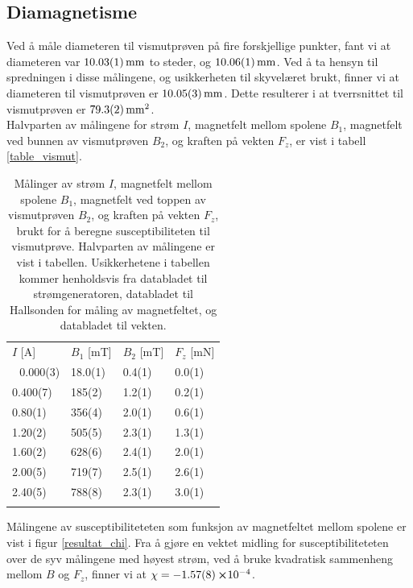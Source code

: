 \documentclass[%
 reprint,
 amsmath,amssymb,
 aps,
 norsk,
]{revtex4-1}
\begin{document}
\subsection{Diamagnetisme}
Ved å måle diameteren til vismutprøven på fire forskjellige punkter, fant vi at diameteren var $\SI{10.03\pm0.01}{\milli\meter}$ to steder, og $\SI{10.06\pm0.01}{\milli\meter}$. Ved å ta hensyn til spredningen i disse målingene, og usikkerheten til skyvelæret brukt, finner vi at diameteren til vismutprøven er $\SI{10.05\pm0.03}{\milli\meter}$. Dette resulterer i at tverrsnittet til vismutprøven er $\SI{79.3\pm0.2}{\milli\meter^2}$.\\
Halvparten av målingene for strøm $I$, magnetfelt mellom spolene $B_1$, magnetfelt ved bunnen av vismutprøven $B_2$, og kraften på vekten $F_z$, er vist i tabell \vref{table_vismut}.
\begin{table}
  \centering
  \caption{Målinger av strøm $I$, magnetfelt mellom spolene $B_1$, magnetfelt ved toppen av vismutprøven $B_2$, og kraften på vekten $F_z$, brukt for å beregne susceptibiliteten til vismutprøve. Halvparten av målingene er vist i tabellen. Usikkerhetene i tabellen kommer henholdsvis fra databladet til strømgeneratoren, databladet til Hallsonden for måling av magnetfeltet, og databladet til vekten.}
  \label{table_vismut}
    \begin{tabular}{@{}llll@{}}\botrule
    $I$ {[}A{]} & $B_1$ {[}mT{]} & $B_2$ {[}mT{]} & $F_z$ {[}mN{]} \\ \colrule 
    0.000(3)    & 18.0(1)        & 0.4(1)         & 0.0(1)      \\
    0.400(7)    & 185(2)         & 1.2(1)         & 0.2(1)      \\
    0.80(1)     & 356(4)         & 2.0(1)         & 0.6(1)      \\
    1.20(2)     & 505(5)         & 2.3(1)         & 1.3(1)        \\
    1.60(2)     & 628(6)         & 2.4(1)         & 2.0(1)        \\
    2.00(5)     & 719(7)         & 2.5(1)         & 2.6(1)        \\
    2.40(5)     & 788(8)         & 2.3(1)         & 3.0(1)        \\\botrule
    \end{tabular}
\end{table}
Målingene av susceptibiliteteten som funksjon av magnetfeltet mellom spolene er vist i figur \vref{resultat_chi}. Fra å gjøre en vektet midling for susceptibiliteteten over de syv målingene med høyest strøm, ved å bruke kvadratisk sammenheng mellom $B$ og $F_z$, finner vi at $\chi = -\SI{1.57\pm0.08}\cross 10^{-4}$.
\end{document}
